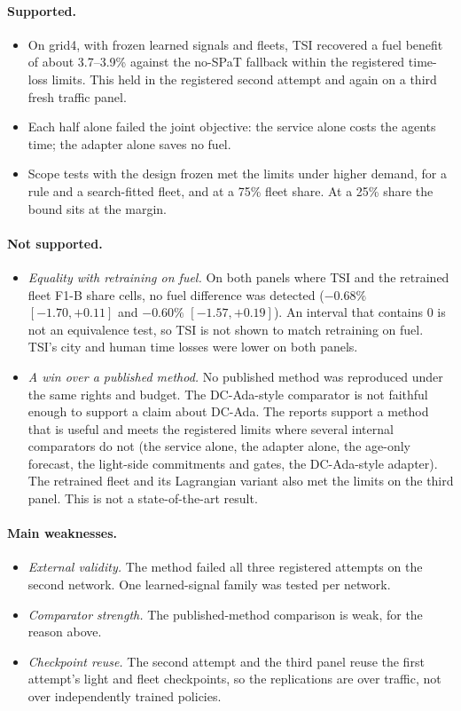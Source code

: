 \documentclass[11pt]{article}
\begin{document}
\paragraph{Supported.}
\begin{itemize}\setlength\itemsep{0pt}
\item On grid4, with frozen learned signals and fleets, TSI recovered a fuel benefit of about 3.7--3.9\% against the no-SPaT fallback within
the registered time-loss limits. This held in the registered second attempt and again on a third fresh traffic panel.
\item Each half alone failed the joint objective: the service alone costs the agents time; the adapter alone saves no fuel.
\item Scope tests with the design frozen met the limits under higher demand, for a rule and a search-fitted fleet, and at a 75\% fleet
share. At a 25\% share the bound sits at the margin.
\end{itemize}
\paragraph{Not supported.}
\begin{itemize}\setlength\itemsep{0pt}
\item \emph{Equality with retraining on fuel.} On both panels where TSI and the retrained fleet F1-B share cells, no fuel difference was
detected ($-0.68\%$ $[-1.70,+0.11]$ and $-0.60\%$ $[-1.57,+0.19]$). An interval that contains 0 is not an equivalence test, so TSI is not
shown to match retraining on fuel. TSI's city and human time losses were lower on both panels.
\item \emph{A win over a published method.} No published method was reproduced under the same rights and budget. The DC-Ada-style
comparator is not faithful enough to support a claim about DC-Ada. The reports support a method that is useful and meets the registered limits where several
internal comparators do not (the service alone, the adapter alone, the age-only forecast, the light-side commitments and gates, the
DC-Ada-style adapter). The retrained fleet and its Lagrangian variant also met the limits on the third panel. This is not a
state-of-the-art result.
\end{itemize}
\paragraph{Main weaknesses.}
\begin{itemize}\setlength\itemsep{0pt}
\item \emph{External validity.} The method failed all three registered attempts on the second network. One learned-signal family was
tested per network.
\item \emph{Comparator strength.} The published-method comparison is weak, for the reason above.
\item \emph{Checkpoint reuse.} The second attempt and the third panel reuse the first attempt's light and fleet checkpoints, so the
replications are over traffic, not over independently trained policies.
\end{itemize}
\end{document}
